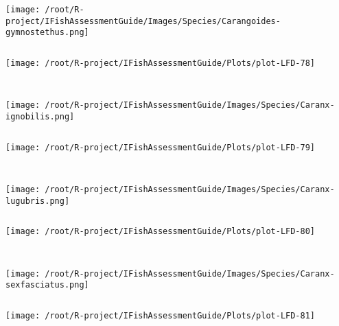 \documentclass{report}\usepackage[]{graphicx}\usepackage[]{color}
\makeatletter
\def\maxwidth{ %
  \ifdim\Gin@nat@width>\linewidth
    \linewidth
  \else
    \Gin@nat@width
  \fi
}
\newenvironment{kframe}{%
 \def\at@end@of@kframe{}%
 \ifinner\ifhmode%
  \def\at@end@of@kframe{\end{minipage}}%
  \begin{minipage}{\columnwidth}%
 \fi\fi%
 \def\FrameCommand##1{\hskip\@totalleftmargin \hskip-\fboxsep
 \colorbox{shadecolor}{##1}\hskip-\fboxsep
     \hskip-\linewidth \hskip-\@totalleftmargin \hskip\columnwidth}%
 \MakeFramed {\advance\hsize-\width
   \@totalleftmargin\z@ \linewidth\hsize
   \@setminipage}}%
 {\par\unskip\endMakeFramed%
 \at@end@of@kframe}
\newenvironment{knitrout}{}{} %
\makeatother
\begin{document}
\begin{knitrout}
\begin{kframe}
\begin{verbatim}
\end{verbatim}
\end{kframe}
\texttt{[image: /root/R-project/IFishAssessmentGuide/Images/Species/Carangoides-gymnostethus.png]}
\begin{kframe}\begin{verbatim}
\end{verbatim}
\end{kframe}
\texttt{[image: /root/R-project/IFishAssessmentGuide/Plots/plot-LFD-78]} 
\begin{kframe}\begin{verbatim}
 
\end{verbatim}
\end{kframe}
\texttt{[image: /root/R-project/IFishAssessmentGuide/Images/Species/Caranx-ignobilis.png]}
\begin{kframe}\begin{verbatim}
\end{verbatim}
\end{kframe}
\texttt{[image: /root/R-project/IFishAssessmentGuide/Plots/plot-LFD-79]} 
\begin{kframe}\begin{verbatim}
 
\end{verbatim}
\end{kframe}
\texttt{[image: /root/R-project/IFishAssessmentGuide/Images/Species/Caranx-lugubris.png]}
\begin{kframe}\begin{verbatim}
\end{verbatim}
\end{kframe}
\texttt{[image: /root/R-project/IFishAssessmentGuide/Plots/plot-LFD-80]} 
\begin{kframe}\begin{verbatim}
 
\end{verbatim}
\end{kframe}
\texttt{[image: /root/R-project/IFishAssessmentGuide/Images/Species/Caranx-sexfasciatus.png]}
\begin{kframe}\begin{verbatim}
\end{verbatim}
\end{kframe}
\texttt{[image: /root/R-project/IFishAssessmentGuide/Plots/plot-LFD-81]} 
\begin{kframe}\begin{verbatim}
 

\end{verbatim}
\end{kframe}
\end{knitrout}
\end{document}
